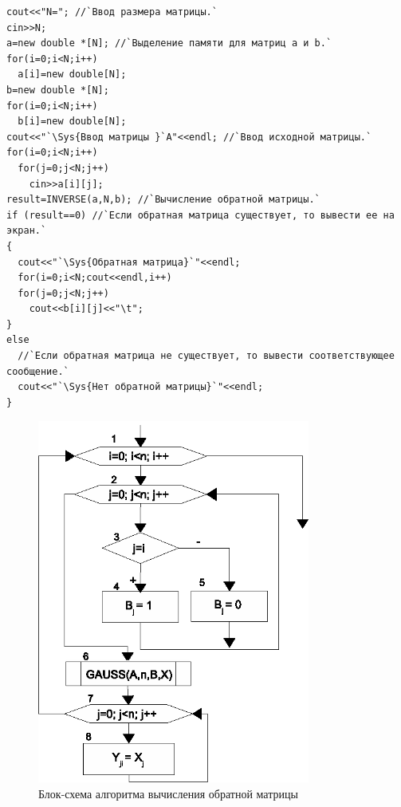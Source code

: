 \begin{lstlisting}
cout<<"N="; //`Ввод размера матрицы.`
cin>>N;
a=new double *[N]; //`Выделение памяти для матриц a и b.`
for(i=0;i<N;i++)
  a[i]=new double[N];
b=new double *[N];
for(i=0;i<N;i++)
  b[i]=new double[N];
cout<<"`\Sys{Ввод матрицы }`A"<<endl; //`Ввод исходной матрицы.`
for(i=0;i<N;i++)
  for(j=0;j<N;j++)
    cin>>a[i][j];
result=INVERSE(a,N,b); //`Вычисление обратной матрицы.`
if (result==0) //`Если обратная матрица существует, то вывести ее на экран.`
{
  cout<<"`\Sys{Обратная матрица}`"<<endl;
  for(i=0;i<N;cout<<endl,i++)
  for(j=0;j<N;j++)
    cout<<b[i][j]<<"\t";
}
else
  //`Если обратная матрица не существует, то вывести соответствующее сообщение.`
  cout<<"`\Sys{Нет обратной матрицы}`"<<endl;
}
\end{lstlisting}

\begin{figure}[htb]
\begin{center}
\includegraphics[width=0.8\textwidth]{img/ris_6_16}
\caption{Блок-схема алгоритма вычисления обратной матрицы}
\label{ch06:refDrawing15}
\end{center}
\end{figure}


